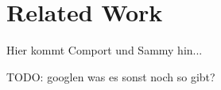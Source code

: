 \chapter{Related Work}
\label{sec:related_work}

Hier kommt Comport und Sammy hin...

TODO: googlen was es sonst noch so gibt?
